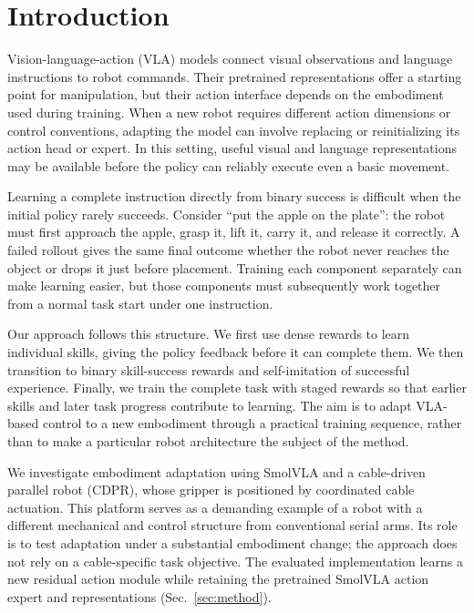 \section{Introduction}\label{sec:introduction}
Vision-language-action (VLA) models connect visual observations and language instructions to robot commands. Their pretrained representations offer a starting point for manipulation, but their action interface depends on the embodiment used during training. When a new robot requires different action dimensions or control conventions, adapting the model can involve replacing or reinitializing its action head or expert. In this setting, useful visual and language representations may be available before the policy can reliably execute even a basic movement.

Learning a complete instruction directly from binary success is difficult when the initial policy rarely succeeds. Consider ``put the apple on the plate'': the robot must first approach the apple, grasp it, lift it, carry it, and release it correctly. A failed rollout gives the same final outcome whether the robot never reaches the object or drops it just before placement. Training each component separately can make learning easier, but those components must subsequently work together from a normal task start under one instruction.

Our approach follows this structure. We first use dense rewards to learn individual skills, giving the policy feedback before it can complete them. We then transition to binary skill-success rewards and self-imitation of successful experience. Finally, we train the complete task with staged rewards so that earlier skills and later task progress contribute to learning. The aim is to adapt VLA-based control to a new embodiment through a practical training sequence, rather than to make a particular robot architecture the subject of the method.

We investigate embodiment adaptation using SmolVLA and a cable-driven parallel robot (CDPR), whose gripper is positioned by coordinated cable actuation. This platform serves as a demanding example of a robot with a different mechanical and control structure from conventional serial arms. Its role is to test adaptation under a substantial embodiment change; the approach does not rely on a cable-specific task objective. The evaluated implementation learns a new residual action module while retaining the pretrained SmolVLA action expert and representations (Sec.~\ref{sec:method}).

